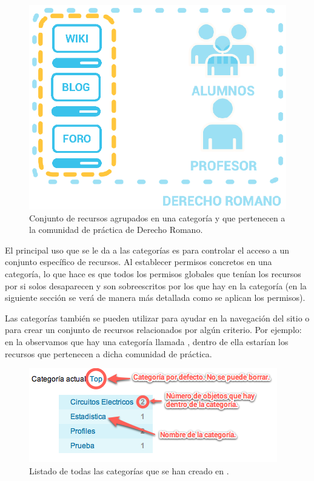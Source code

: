 \begin{figure}
\centering
\includegraphics[width=.8\linewidth]{../graphics/fig_comunidad_de_practica_derecho_categorias.eps}
\caption{Conjunto de recursos agrupados en una categoría y que pertenecen a la comunidad de práctica de Derecho Romano.}\label{fig:comunidad_de_practica_categorias}
\end{figure}

El principal uso que se le da a las categorías es para controlar el acceso a un conjunto específico de recursos. Al establecer permisos concretos en una categoría, lo que hace es que todos los permisos globales que tenían los recursos por si solos desaparecen y son sobreescritos por los que hay en la categoría (en la siguiente sección se verá de manera más detallada como se aplican los permisos).

Las categorías también se pueden utilizar para ayudar en la navegación del sitio o para crear un conjunto de recursos relacionados por algún criterio. Por ejemplo: en la  observamos que hay una categoría llamada , dentro de ella estarían los recursos que pertenecen a dicha comunidad de práctica.

\begin{figure}
\centering
\includegraphics[scale=.8]{../graphics/fig_listado_categorias.png}
\caption{Listado de todas las categorías que se han creado en \tiki{}.}\label{fig:listado_categorias}
\end{figure}

